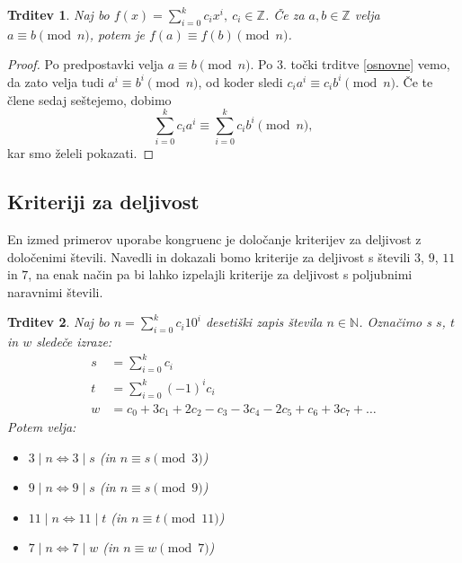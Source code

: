 \documentclass[12pt, a4paper]{article}
\newtheorem{trd}{Trditev}
\begin{document}
\begin{trd}
Naj bo $f(x)=\sum_{i=0}^{k} c_{i}x^{i},\ c_{i}\in \mathbb{Z}$. Če za $a,b \in \mathbb{Z}$ velja $a\equiv b \pmod n$, potem je $f(a)\equiv f(b) \pmod n$.
\end{trd}

\begin{proof}
Po predpostavki velja $a\equiv b \pmod n$. Po 3. točki trditve \ref{osnovne} vemo, da zato velja tudi $a^{i}\equiv b^{i} \pmod n$, od koder sledi $c_{i}a^{i}\equiv c_{i}b^{i} \pmod n$. Če te člene sedaj seštejemo, dobimo
$$\sum_{i=0}^{k} c_{i}a^{i} \equiv \sum_{i=0}^{k} c_{i}b^{i} \pmod n,$$
kar smo želeli pokazati.
\end{proof}

\subsection{Kriteriji za deljivost}

En izmed primerov uporabe kongruenc je določanje kriterijev za deljivost z določenimi števili. Navedli in dokazali bomo kriterije za deljivost s števili $3$, $9$, $11$ in $7$, na enak način pa bi lahko izpelajli kriterije za deljivost s poljubnimi naravnimi števili.

\begin{trd}
Naj bo $n=\sum_{i=0}^{k} c_{i}10^{i}$ desetiški zapis števila $n\in \mathbb{N}$. Označimo s $s$, $t$ in $w$ sledeče izraze:
\begin{align*}
s&=\sum_{i=0}^{k}c_{i} \\
t&=\sum_{i=0}^{k}(-1)^{i}c_{i} \\
w&=c_{0}+3c_{1}+2c_{2}-c_{3}-3c_{4}-2c_{5}+c_{6}+3c_{7}+\ldots
\end{align*}
Potem velja:
\begin{itemize}
\item[$(i)$] $3\mid n \iff 3\mid s$ (in $n\equiv s \pmod 3$)
\item[$(ii)$] $9\mid n \iff 9\mid s$ (in $n\equiv s \pmod 9$)
\item[$(iii)$] $11\mid n \iff 11\mid t$ (in $n\equiv t \pmod{11}$)
\item[$(iv)$] $7\mid n \iff 7\mid w$ (in $n\equiv w \pmod 7$)
\end{itemize}
\end{trd}
\end{document}
